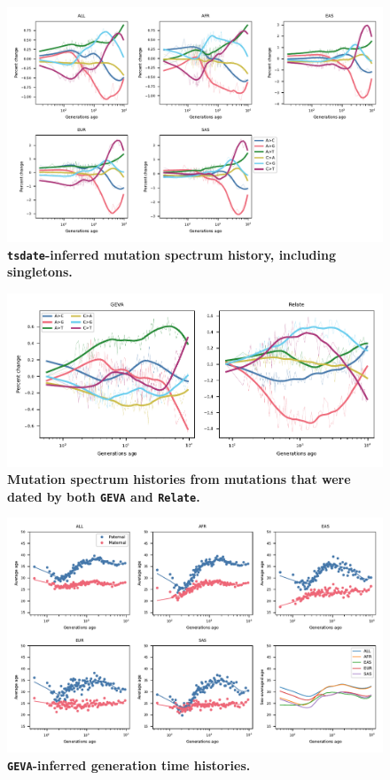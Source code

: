 \documentclass[]{article}
\newcommand{\GEVA}{\texttt{GEVA}\xspace}
\newcommand{\tsdate}{\texttt{tsdate}\xspace}
\newcommand{\relate}{\texttt{Relate}\xspace}
\begin{document}
\begin{figure}[ht!]
    \centering
    \includegraphics[width=\textwidth]{../plots/spectrum_history.tsdate.max_age.10000.singletons.pdf}
    \caption{
        \textbf{\tsdate-inferred mutation spectrum history, including singletons.}
    }
    \label{fig:tsdate-spectra-singletons}
\end{figure}


\begin{figure}[ht!]
    \centering
    \includegraphics{../plots/overlapping.geva.relate.pdf}
    \caption{
        \textbf{Mutation spectrum histories from mutations that were dated by
        both \GEVA and \relate.}
    }
    \label{fig:overlap-spectra}
\end{figure}


\begin{figure}[ht!]
    \centering
    \includegraphics[width=\textwidth]{../plots/inferred_generation_times.DM.geva.max_age.10000.pdf}
    \caption{
        \textbf{\GEVA-inferred generation time histories.}
    }
    \label{fig:geva-gen-times}
\end{figure}
\end{document}
